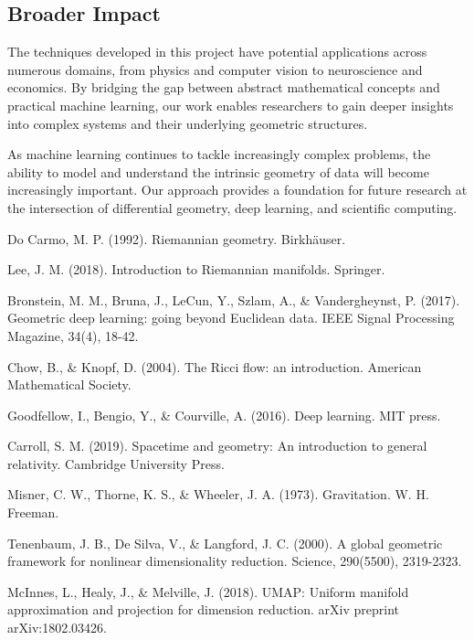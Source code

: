\documentclass[11pt,a4paper]{article}
\begin{document}
\subsection{Broader Impact}

The techniques developed in this project have potential applications across numerous domains, from physics and computer vision to neuroscience and economics. By bridging the gap between abstract mathematical concepts and practical machine learning, our work enables researchers to gain deeper insights into complex systems and their underlying geometric structures.

As machine learning continues to tackle increasingly complex problems, the ability to model and understand the intrinsic geometry of data will become increasingly important. Our approach provides a foundation for future research at the intersection of differential geometry, deep learning, and scientific computing.


\begin{thebibliography}{9}

Do Carmo, M. P. (1992). Riemannian geometry. Birkhäuser.

Lee, J. M. (2018). Introduction to Riemannian manifolds. Springer.

Bronstein, M. M., Bruna, J., LeCun, Y., Szlam, A., \& Vandergheynst, P. (2017). Geometric deep learning: going beyond Euclidean data. IEEE Signal Processing Magazine, 34(4), 18-42.

Chow, B., \& Knopf, D. (2004). The Ricci flow: an introduction. American Mathematical Society.

Goodfellow, I., Bengio, Y., \& Courville, A. (2016). Deep learning. MIT press.

Carroll, S. M. (2019). Spacetime and geometry: An introduction to general relativity. Cambridge University Press.

Misner, C. W., Thorne, K. S., \& Wheeler, J. A. (1973). Gravitation. W. H. Freeman.

Tenenbaum, J. B., De Silva, V., \& Langford, J. C. (2000). A global geometric framework for nonlinear dimensionality reduction. Science, 290(5500), 2319-2323.

McInnes, L., Healy, J., \& Melville, J. (2018). UMAP: Uniform manifold approximation and projection for dimension reduction. arXiv preprint arXiv:1802.03426.

\end{thebibliography}
\end{document}
